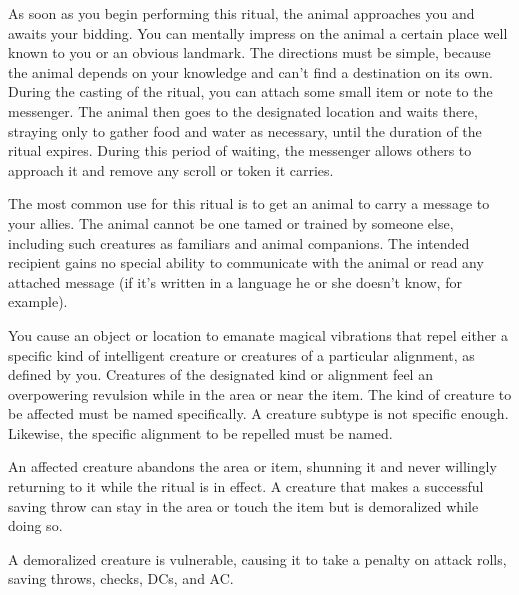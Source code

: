 \spellrng{\rnglong}
\begin{spelleffect}
As soon as you begin performing this ritual, the animal approaches you and awaits your bidding. You can mentally impress on the animal a certain place well known to you or an obvious landmark. The directions must be simple, because the animal depends on your knowledge and can't find a destination on its own. During the casting of the ritual, you can attach some small item or note to the messenger. The animal then goes to the designated location and waits there, straying only to gather food and water as necessary, until the duration of the ritual expires. During this period of waiting, the messenger allows others to approach it and remove any scroll or token it carries.
\end{spelleffect}
\begin{spellnotes}
The most common use for this ritual is to get an animal to carry a message to your allies. The animal cannot be one tamed or trained by someone else, including such creatures as familiars and animal companions. The intended recipient gains no special ability to communicate with the animal or read any attached message (if it's written in a language he or she doesn't know, for example).
\end{spellnotes}

\spellrng{\rngclose}
\begin{spelleffect}
You cause an object or location to emanate magical vibrations that repel either a specific kind of intelligent creature or creatures of a particular alignment, as defined by you. Creatures of the designated kind or alignment feel an overpowering revulsion while in the area or near the item. The kind of creature to be affected must be named specifically. A creature subtype is not specific enough. Likewise, the specific alignment to be repelled must be named.
\par An affected creature abandons the area or item, shunning it and never willingly returning to it while the ritual is in effect. A creature that makes a successful saving throw can stay in the area or touch the item but is demoralized while doing so.
\end{spelleffect}
\begin{spellnotes}
A demoralized creature is vulnerable, causing it to take a  penalty on attack rolls, saving throws, checks, DCs, and AC.
\end{spellnotes}


